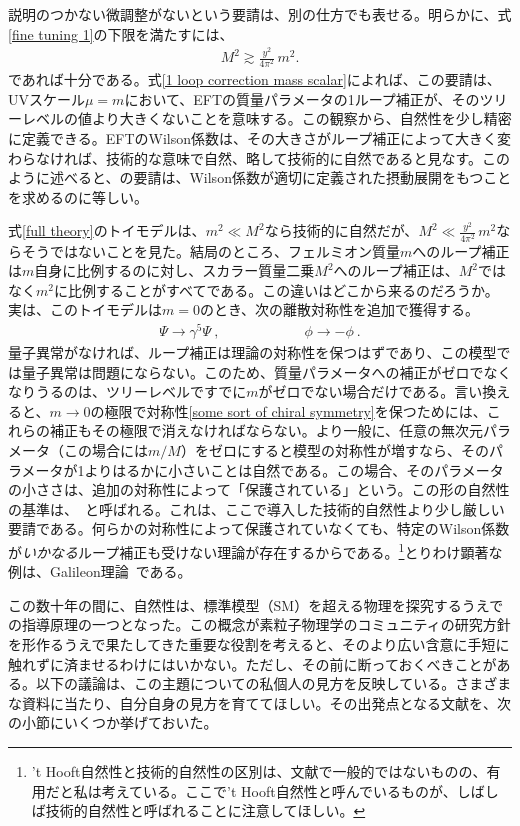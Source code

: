 説明のつかない微調整がないという要請は、別の仕方でも表せる。明らかに、式\eqref{fine tuning 1}の下限を満たすには、
%
\begin{align} \label{t Hooft naturalness}
	M^2 \gtrsim \frac{y^2}{4 \pi^2} \, m^2 .
\end{align}
%
であれば十分である。式\eqref{1 loop correction mass scalar}によれば、この要請は、UVスケール$\mu = m$において、EFTの質量パラメータの1ループ補正が、そのツリーレベルの値より大きくないことを意味する。この観察から、自然性を少し精密に定義できる。EFTのWilson係数は、その大きさがループ補正によって大きく変わらなければ、技術的な意味で自然、略して技術的に自然であると見なす。このように述べると、の要請は、Wilson係数が適切に定義された摂動展開をもつことを求めるのに等しい。

式\eqref{full theory}のトイモデルは、$m^2 \ll M^2$なら技術的に自然だが、$M^2 \ll \frac{y^2}{4 \pi^2} \, m^2$ならそうではないことを見た。結局のところ、フェルミオン質量$m$へのループ補正は$m$自身に比例するのに対し、スカラー質量二乗$M^2$へのループ補正は、$M^2$ではなく$m^2$に比例することがすべてである。この違いはどこから来るのだろうか。実は、このトイモデルは$m = 0$のとき、次の離散対称性を追加で獲得する。
%
\begin{align} \label{some sort of chiral symmetry}
	\Psi \to \gamma^5 \Psi \ , \qquad \qquad \qquad \phi \to - \phi \ .
\end{align}
%
量子異常がなければ、ループ補正は理論の対称性を保つはずであり、この模型では量子異常は問題にならない。このため、質量パラメータへの補正がゼロでなくなりうるのは、ツリーレベルですでに$m$がゼロでない場合だけである。言い換えると、$m \to 0$の極限で対称性\eqref{some sort of chiral symmetry}を保つためには、これらの補正もその極限で消えなければならない。より一般に、任意の無次元パラメータ（この場合には$m/M$）をゼロにすると模型の対称性が増すなら、そのパラメータが1よりはるかに小さいことは自然である。この場合、そのパラメータの小ささは、追加の対称性によって「保護されている」という。この形の自然性の基準は、~\cite{tHooft:1979bh}と呼ばれる。これは、ここで導入した技術的自然性より少し厳しい要請である。何らかの対称性によって保護されていなくても、特定のWilson係数が{\it いかなる}ループ補正も受けない理論が存在するからである。\footnote{'t Hooft自然性と技術的自然性の区別は、文献で一般的ではないものの、有用だと私は考えている。ここで't Hooft自然性と呼んでいるものが、しばしば技術的自然性と呼ばれることに注意してほしい。}とりわけ顕著な例は、Galileon理論~\cite{Goon:2016ihr}である。

この数十年の間に、自然性は、標準模型（SM）を超える物理を探究するうえでの指導原理の一つとなった。この概念が素粒子物理学のコミュニティの研究方針を形作るうえで果たしてきた重要な役割を考えると、そのより広い含意に手短に触れずに済ませるわけにはいかない。ただし、その前に断っておくべきことがある。以下の議論は、この主題についての私個人の見方を反映している。さまざまな資料に当たり、自分自身の見方を育ててほしい。その出発点となる文献を、次の小節にいくつか挙げておいた。

